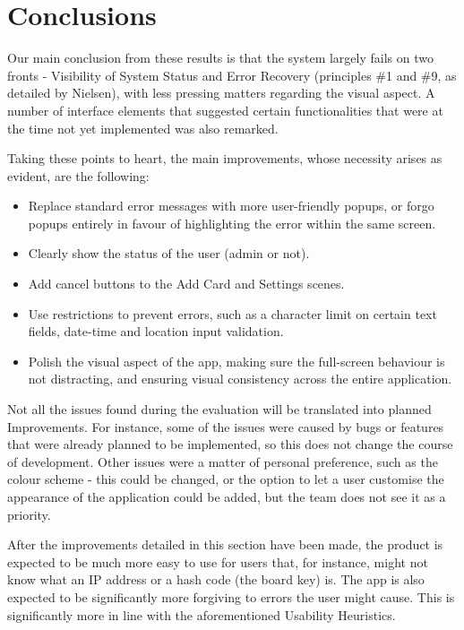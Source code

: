 \section{Conclusions}


Our main conclusion from these results is that the system largely fails on two fronts - Visibility of System Status and Error Recovery (principles \#1 and \#9, as detailed by Nielsen), with less pressing matters regarding the visual aspect. A number of interface elements that suggested certain functionalities that were at the time not yet implemented was also remarked.

Taking these points to heart, the main improvements, whose necessity arises as evident, are the following:
\begin{itemize}
    \item Replace standard error messages with more user-friendly popups, or forgo popups entirely in favour of highlighting the error within the same screen.
    \item Clearly show the status of the user (admin or not).
    \item Add cancel buttons to the Add Card and Settings scenes.
    \item Use restrictions to prevent errors, such as a character limit on certain text fields, date-time and location input validation.
    \item Polish the visual aspect of the app, making sure the full-screen behaviour is not distracting, and ensuring visual consistency across the entire application.
\end{itemize}

Not all the issues found during the evaluation will be translated into planned Improvements. For instance, some of the issues were caused by bugs or features that were already planned to be implemented, so this does not change the course of development. Other issues were a matter of personal preference, such as the colour scheme - this could be changed, or the option to let a user customise the appearance of the application could be added, but the team does not see it as a priority.

After the improvements detailed in this section have been made, the product is expected to be much more easy to use for users that, for instance, might not know what an IP address or a hash code (the board key) is. The app is also expected to be significantly more forgiving to errors the user might cause. This is significantly more in line with the aforementioned Usability Heuristics.

